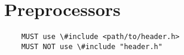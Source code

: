 \chapter{Preprocessors}
\begin{lstlisting}
    MUST use \#include <path/to/header.h>
    MUST NOT use \#include "header.h"
\end{lstlisting}
